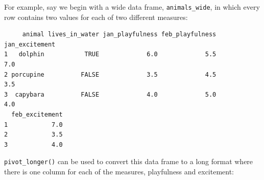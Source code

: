 \documentclass[
]{book}
\begin{document}
For example, say we begin with a wide data frame, \texttt{animals\_wide}, in which every row contains two values for each of two different measures:

\begin{verbatim}
     animal lives_in_water jan_playfulness feb_playfulness jan_excitement
1   dolphin           TRUE             6.0             5.5            7.0
2 porcupine          FALSE             3.5             4.5            3.5
3  capybara          FALSE             4.0             5.0            4.0
  feb_excitement
1            7.0
2            3.5
3            4.0
\end{verbatim}

\texttt{pivot\_longer()} can be used to convert this data frame to a long format where there is one column for each of the measures, playfulness and excitement:
\end{document}
